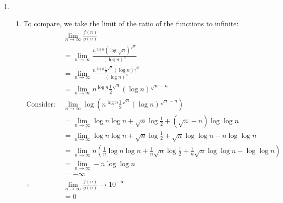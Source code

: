 \documentclass{article}
\begin{document}
\begin{enumerate}[label=(\alph*)]
\begin{enumerate}[label=\roman*.]
          \end{enumerate}
    \item
          \begin{enumerate}[label=\roman*.]
              \item To compare, we take the limit of the ratio of the functions to infinite: \begin{align*}
                                          & \lim_{n\to\infty}\frac{f(n)}{g(n)}                                                                                                 \\
                                          & = \lim_{n\to\infty}\frac{n^{\log n} (\log \sqrt{n})^{\sqrt{n}}}{(\log n)^n}                                                        \\
                                          & = \lim_{n\to\infty}\frac{n^{\log n} {\frac12}^{\sqrt{n}} (\log n)^{\sqrt{n}}}{(\log n)^n}                                          \\
                                          & = \lim_{n\to\infty}{n^{\log n} {\frac12}^{\sqrt{n}} (\log n)^{\sqrt{n}-n}}                                                         \\
                        \text{Consider: } & \lim_{n\to\infty}\log(n^{\log n} {\frac12}^{\sqrt{n}} (\log n)^{\sqrt{n}-n})                                                       \\
                                          & = \lim_{n\to\infty}\log n\log n + \sqrt{n}\log \frac12 + (\sqrt{n}-n)\log \log n                                                   \\
                                          & = \lim_{n\to\infty}\log n\log n + \sqrt{n}\log \frac12 + \sqrt{n}\log \log n - n\log \log n                                        \\
                                          & = \lim_{n\to\infty}n (\frac{1}{n} \log n\log n + \frac{1}{n} \sqrt{n}\log \frac12 + \frac{1}{n} \sqrt{n}\log \log n - \log \log n) \\
                                          & = \lim_{n\to\infty} -n \log \log n                                                                                                 \\
                                          & = -\infty                                                                                                                          \\
                        \therefore        & \lim_{n\to\infty}\frac{f(n)}{g(n)} \to 10^{-\infty}                                                                                \\
                                          & = 0
                    \end{align*}


\end{enumerate}
\end{enumerate}
\end{document}

